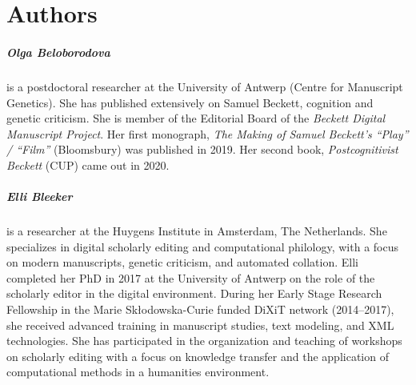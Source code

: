 \pagestyle{authors}
\chapter*{Authors}
\protect\thispagestyle{chaptertitlepage}



\paragraph{Olga Beloborodova} is a postdoctoral researcher at the University of Antwerp (Centre for Manuscript Genetics). She has published extensively on Samuel Beckett, cognition and genetic criticism. She is member of the Editorial Board of the \emph{Beckett Digital Manuscript Project}. Her first monograph, \emph{The Making of Samuel Beckett’s ``Play'' / ``Film''} (Bloomsbury) was published in 2019. Her second book, \emph{Postcognitivist Beckett} (CUP) came out in 2020.

\paragraph{Elli Bleeker} is a researcher at the Huygens Institute in Amsterdam, The Netherlands. She specializes in digital scholarly editing and computational philology, with a focus on modern manuscripts, genetic criticism, and automated collation. Elli completed her PhD in 2017 at the University of Antwerp on the role of the scholarly editor in the digital environment. During her Early Stage Research Fellowship in the Marie Skłodowska-Curie funded DiXiT network (2014–2017), she received advanced training in manuscript studies, text modeling, and XML technologies. She has participated in the organization and teaching of workshops on scholarly editing with a focus on knowledge transfer and the application of computational methods in a humanities environment.

